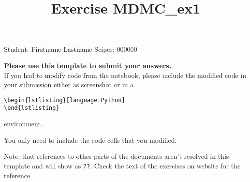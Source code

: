 \documentclass{article}
\title{Exercise MDMC_ex1}
\begin{document}
\maketitle\maketitle

Student:  Firstname Lastname    Sciper: 000000

\begin{mdframed}
\textbf{Please use this template to submit your answers.}\\
If you had to modify code from the notebook, please include the modified code in your submission either as screenshot or in a

\begin{verbatim}
\begin{lstlisting}[language=Python]
\end{lstlisting}
\end{verbatim}

environment.

You only need to include the code cells that you modified.

Note, that references to other parts of the documents aren't resolved in this template and will show as \texttt{??}. Check the text of the exercises on website for the reference
\end{mdframed}

\end{document}
